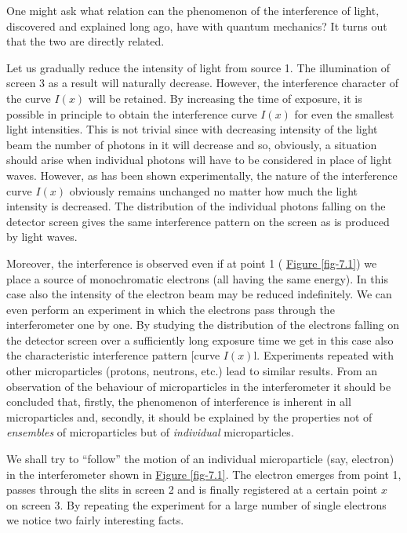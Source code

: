 \documentclass[a4paper,sfsidenotes,colorlinks=true]{tufte-book}
\numberwithin{equation}{section}
\numberwithin{figure}{section}
\begin{document}
One might ask what relation can the phenomenon of the interference of light, discovered and explained long ago, have with quantum mechanics? It turns out that the two are directly related.


Let us gradually reduce the intensity of light from source \textsf{1}. The illumination of screen \textsf{3} as a result will naturally decrease. However, the interference character of the curve $I(x)$ will be retained. By increasing the time of exposure, it is possible in principle to obtain the interference curve $I(x)$ for even the smallest light intensities. This is not trivial since with decreasing intensity of the light beam the number of photons in it will decrease and so, obviously, a situation should arise when individual photons will have to be considered in place of light waves. However, as has been shown experimentally, the nature of the interference curve $I(x)$ obviously remains unchanged no matter how much the light intensity is decreased. The distribution of the individual photons falling on the detector screen gives the same interference pattern on the screen as is produced by light waves.


Moreover, the interference is observed even if at point \textsf{1} ( \hyperref[fig-7.1]{Figure \ref{fig-7.1}}) we place a source of monochromatic electrons (all having the same energy). In this case also the intensity of the electron beam may be reduced indefinitely. We can even perform an experiment in which the electrons pass through the interferometer one by one. By studying the distribution of the electrons falling on the detector screen over a sufficiently long exposure time we get in this case also the characteristic interference pattern [curve $I(x)$l. Experiments repeated with other microparticles (protons, neutrons, etc.) lead to similar results. From an observation of the behaviour of microparticles in the interferometer it should be concluded that, firstly, the phenomenon of interference is inherent in all microparticles and, secondly, it should be explained by the properties not of \emph{ensembles} of microparticles but of \emph{individual} microparticles.


We shall try to ``follow'' the motion of an individual microparticle (say, electron) in the interferometer shown in  \hyperref[fig-7.1]{Figure \ref{fig-7.1}}. The electron emerges from point \textsf{1}, passes through the slits in screen \textsf{2} and is finally registered at a certain point $x$ on screen \textsf{3}. By repeating the experiment for a large number of single electrons we notice two fairly interesting facts.
\end{document}
